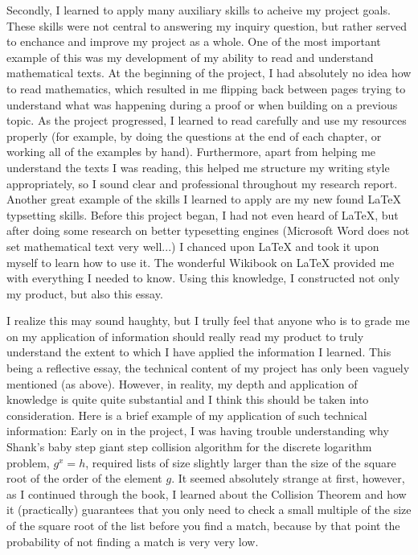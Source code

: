 \documentclass[12pt, a4paper, draft]{report}
\begin{document}
Secondly, I learned to apply many auxiliary skills to acheive my project
goals. These skills were not central to answering my inquiry question, but
rather served to enchance and improve my project as a whole. One of the
most important example of this was my development of my ability to read
and understand mathematical texts. At the beginning of the project, I had
absolutely no idea how to read mathematics, which resulted in me flipping
back between pages trying to understand what was happening during a proof
or when building on a previous topic. As the project progressed, I learned
to read carefully and use my resources properly (for example, by doing
the questions at the end of each chapter, or working all of the examples
by hand). Furthermore, apart from helping me understand the texts I was
reading, this helped me structure my writing style appropriately, so I
sound clear and professional throughout my research report. Another great
example of the skills I learned to apply are my new found {\LaTeX} typsetting
skills. Before this project began, I had not even heard of {\LaTeX},
but after doing some research on better typesetting engines (Microsoft Word
does not set mathematical text very well...) I chanced upon {\LaTeX} and took
it upon myself to learn how to use it. The wonderful Wikibook on {\LaTeX}
provided me with everything I needed to know. Using this knowledge, I
constructed not only my product, but also this essay.

I realize this may sound haughty, but I trully feel that anyone who is to
grade me on my application of information should really read my product to
truly understand the extent to which I have applied the information I
learned. This being a reflective essay, the technical content of my project
has only been vaguely mentioned (as above). However, in reality, my depth
and application of knowledge is quite quite substantial and I think this
should be taken into consideration. Here is a brief example of my
application of such technical information: Early on in the project, I was
having trouble understanding why Shank's baby step giant step collision
algorithm for the discrete logarithm problem, $g^x = h$, required lists of
size slightly larger than the size of the square root of the order of the
element $g$. It seemed absolutely strange at first, however, as I continued
through the book, I learned about the Collision Theorem and how it
(practically) guarantees that you only need to check a small multiple of
the size of the square root of the list before you find a match, because
by that point the probability of not finding a match is very very low.
\end{document}
